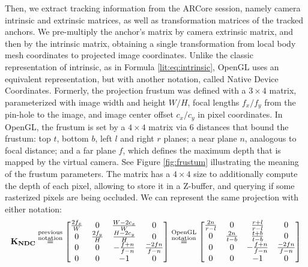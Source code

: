 Then, we extract tracking information from the ARCore session, namely camera intrinsic and extrinsic matrices, as well as transformation matrices of the tracked anchors. We pre-multiply the anchor's matrix by camera extrinsic matrix, and then by the intrinsic matrix, obtaining a single transformation from local body mesh coordinates to projected image coordinates. Unlike the classic representation of intrinsic, as in Formula \ref{lit:eq:intrinsic}, OpenGL uses an equivalent representation, but with another notation, called Native Device Coordinates. Formerly, the projection frustum was defined with a $3 \times 4$ matrix, parameterized with image width and height $W/H$, focal lengths $f_x/f_y$ from the pin-hole to the image, and image center offset $c_x/c_y$ in pixel coordinates. In OpenGL, the frustum is set by a $4 \times 4$ matrix via 6 distances that bound the frustum: top $t$, bottom $b$, left $l$ and right $r$ planes; a near plane $n$, analogous to focal distance; and a far plane $f$, which defines the maximum depth that is mapped by the virtual camera. See Figure \ref{fig:frustum} illustrating the meaning of the frustum parameters. The matrix has a $4 \times 4$ size to additionally compute the depth of each pixel, allowing to store it in a Z-buffer, and querying if some rasterized pixels are being occluded.  We can represent the same projection with either notation:
\begin{equation}
	\bm{\mathrm{K_{NDC}}} \overset{\begin{subarray}{l}\text{previous} \\ \text{notation}\end{subarray}}{=} 
	\begin{bmatrix} 
		\tfrac{2f_x}{W} & 0                & \tfrac{W - 2c_x}{W}  & 0 \\ 
		0               & \tfrac{2f_y}{H}  & \tfrac{H - 2c_y}{H}  & 0 \\
		0               & 0                & -\tfrac{f + n}{f - n} & \tfrac{-2fn}{f - n} \\
		0               & 0                & -1                   & 0
	\end{bmatrix} \overset{\begin{subarray}{l}\text{OpenGL} \\ \text{notation}\end{subarray}}{=} 
	\begin{bmatrix} 
		\tfrac{2n}{r - l} & 0              & \tfrac{r + l}{r - l} & 0 \\
		0               & \tfrac{2n}{t - b}  & \tfrac{t + b}{t - b} & 0 \\
		0               & 0                & -\tfrac{f + n}{f - n} & \tfrac{-2fn}{f - n} \\
		0               & 0                & -1                   & 0
	\end{bmatrix}
	\label{methods:eq:ndc-projection}
\end{equation}

